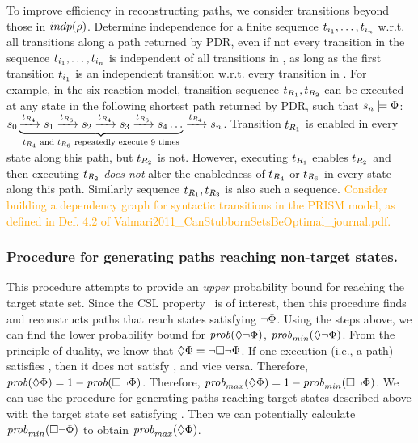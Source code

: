 To improve efficiency in reconstructing paths, we consider transitions
beyond those in \ensuremath{\indp{\rho}}. \textcolor{OliveGreen}{Determine independence for a finite
	sequence \ensuremath{\tranSeq{i_{1}}{i_{n}}} w.r.t. all
	transitions along a path returned by PDR, even if not every transition in the
	sequence \ensuremath{\tranSeq{i_{1}}{i_{n}}} is independent of all transitions in
	\pathFull, as long as the first transition
	\ensuremath{\tran{i_{1}}} is an independent transition w.r.t. every
	transition in \pathFull.} For example, in the six-reaction model,
transition sequence \ensuremath{\tran{R_{1}}, \tran{R_{2}}} can be executed at any state in the following
shortest path returned by PDR, such that \ensuremath{\state{n} \models
	\targetSt{}}:\\ \ensuremath{\initSt
	\underbrace{\xrightarrow{\tran{R_{4}}} \state{1}
		\xrightarrow{\tran{R_{6}}} \state{2} \xrightarrow{\tran{R_{4}}}
		\state{3} \xrightarrow{\tran{R_{6}}} \state{4} \dots}_{\text{\tran{R_{4}}
			and \tran{R_{6}} repeatedly execute 9 times}} \xrightarrow{\tran{R_{4}}} \state{n}}. Transition
\ensuremath{\tran{R_{1}}} is enabled in every state along this path,
but \ensuremath{\tran{R_{2}}} is not. However, executing
\ensuremath{\tran{R_{1}}} enables \ensuremath{\tran{R_{2}}} and then
executing \ensuremath{\tran{R_{2}}} \emph{does not} alter the
enabledness of \ensuremath{\tran{R_{4}}} or \ensuremath{\tran{R_{6}}}
in every state along this path. Similarly sequence
\ensuremath{\tran{R_{1}}, \tran{R_{3}}} is also such a
sequence. \textcolor{orange}{Consider building a dependency graph for
	syntactic transitions in the PRISM model, as defined in Def. 4.2 of Valmari2011\_CanStubbornSetsBeOptimal\_journal.pdf.}

\subsubsection*{Procedure for generating paths reaching non-target
	states. }
This procedure attempts to provide an \emph{upper} probability bound for reaching the
target state set. Since the CSL property \cslEventually\ is of interest,
then this procedure finds and reconstructs paths that reach states
satisfying \ensuremath{\lnot\targetSt}. Using the steps above, we can
find the lower probability bound for
\ensuremath{\prob(\eventuallyNot)}, \ensuremath{\prob_{min}
	(\eventuallyNot)}. From the principle of duality, we know that
\ensuremath{\eventually = \lnot \alwaysNot}. If one execution (i.e., a
path) satisfies \eventually, then it does not satisfy \alwaysNot, and
vice versa. Therefore, \ensuremath{\prob(\eventually) = 1 -
	\prob(\alwaysNot)}. Therefore, \ensuremath{\probMax{\eventually} =
	1- \probMin{\alwaysNot}}. We can use the procedure for generating
paths reaching target states described above with the target state set
satisfying \alwaysNot. Then we can potentially calculate
\ensuremath{\probMin{\alwaysNot}} to obtain \ensuremath{\probMax{\eventually}}.

